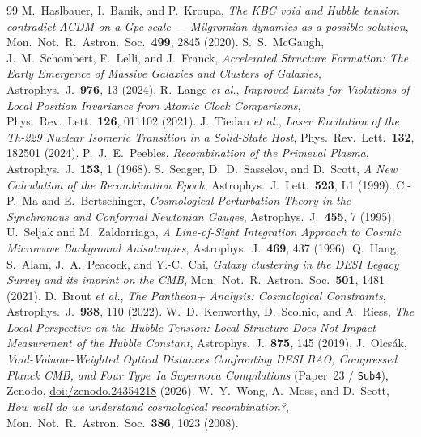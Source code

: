 \documentclass[11pt,a4paper]{article}
\begin{document}
\begin{thebibliography}{99}
 M.~Haslbauer, I.~Banik, and P.~Kroupa, \textit{The KBC void and Hubble tension contradict $\Lambda$CDM on a Gpc scale --- Milgromian dynamics as a possible solution}, Mon.\ Not.\ R.\ Astron.\ Soc.\ \textbf{499}, 2845 (2020).
 S.~S.~McGaugh, J.~M.~Schombert, F.~Lelli, and J.~Franck, \textit{Accelerated Structure Formation: The Early Emergence of Massive Galaxies and Clusters of Galaxies}, Astrophys.\ J.\ \textbf{976}, 13 (2024).
 R.~Lange \textit{et al.}, \textit{Improved Limits for Violations of Local Position Invariance from Atomic Clock Comparisons}, Phys.\ Rev.\ Lett.\ \textbf{126}, 011102 (2021).
 J.~Tiedau \textit{et al.}, \textit{Laser Excitation of the Th-229 Nuclear Isomeric Transition in a Solid-State Host}, Phys.\ Rev.\ Lett.\ \textbf{132}, 182501 (2024).
 P.~J.~E.~Peebles, \textit{Recombination of the Primeval Plasma}, Astrophys.\ J.\ \textbf{153}, 1 (1968).
 S.~Seager, D.~D.~Sasselov, and D.~Scott, \textit{A New Calculation of the Recombination Epoch}, Astrophys.\ J.\ Lett.\ \textbf{523}, L1 (1999).
 C.-P.~Ma and E.~Bertschinger, \textit{Cosmological Perturbation Theory in the Synchronous and Conformal Newtonian Gauges}, Astrophys.\ J.\ \textbf{455}, 7 (1995).
 U.~Seljak and M.~Zaldarriaga, \textit{A Line-of-Sight Integration Approach to Cosmic Microwave Background Anisotropies}, Astrophys.\ J.\ \textbf{469}, 437 (1996).
 Q.~Hang, S.~Alam, J.~A.~Peacock, and Y.-C.~Cai, \textit{Galaxy clustering in the DESI Legacy Survey and its imprint on the CMB}, Mon.\ Not.\ R.\ Astron.\ Soc.\ \textbf{501}, 1481 (2021).
 D.~Brout \textit{et al.}, \textit{The Pantheon+ Analysis: Cosmological Constraints}, Astrophys.\ J.\ \textbf{938}, 110 (2022).
 W.~D.~Kenworthy, D.~Scolnic, and A.~Riess, \textit{The Local Perspective on the Hubble Tension: Local Structure Does Not Impact Measurement of the Hubble Constant}, Astrophys.\ J.\ \textbf{875}, 145 (2019).
 J.~Olcs\'ak, \textit{Void-Volume-Weighted Optical Distances Confronting DESI BAO, Compressed Planck CMB, and Four Type~Ia Supernova Compilations} (Paper~23 / {\upshape\texttt{Sub4}}), Zenodo, \href{https://doi.org/10.5281/zenodo.24354218}{doi:/\allowbreak zenodo.24354218} (2026).
 W.~Y.~Wong, A.~Moss, and D.~Scott, \textit{How well do we understand cosmological recombination?}, Mon.\ Not.\ R.\ Astron.\ Soc.\ \textbf{386}, 1023 (2008).

\end{thebibliography}
\end{document}
